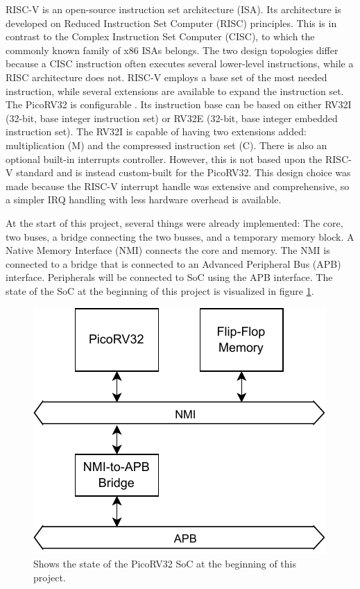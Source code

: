 RISC-V is an open-source instruction set architecture (ISA). Its architecture is developed on Reduced Instruction Set Computer (RISC) principles. This is in contrast to the Complex Instruction Set Computer (CISC), to which the commonly known family of x86 ISAs belongs. The two design topologies differ because a CISC instruction often executes several lower-level instructions, while a RISC architecture does not. RISC-V employs a base set of the most needed instruction, while several extensions are available to expand the instruction set. The PicoRV32 is configurable \cite{picorv_nmi_if}. Its instruction base can be based on either RV32I (32-bit, base integer instruction set) or RV32E (32-bit, base integer embedded instruction set). The RV32I is capable of having two extensions added: multiplication (M) and the compressed instruction set (C). There is also an optional built-in interrupts controller. However, this is not based upon the RISC-V standard and is instead custom-built for the PicoRV32. This design choice was made because the RISC-V interrupt handle was extensive and comprehensive, so a simpler IRQ handling with less hardware overhead is available.

At the start of this project, several things were already implemented: The core, two buses, a bridge connecting the two busses, and a temporary memory block. A Native Memory Interface (NMI) connects the core and memory. The NMI is connected to a bridge that is connected to an Advanced Peripheral Bus (APB) interface. Peripherals will be connected to SoC using the APB interface. The state of the SoC at the beginning of this project is visualized in figure \ref{fig:PicoRV32SoC@beginning}.  

\begin{figure}[H]
    \centering
    \includegraphics[width=0.5\linewidth]{subfiles/imgs/picorvSOCbeginning.drawio.pdf}
    \caption{Shows the state of the PicoRV32 SoC at the beginning of this project.}
    \label{fig:PicoRV32SoC@beginning}
\end{figure}

